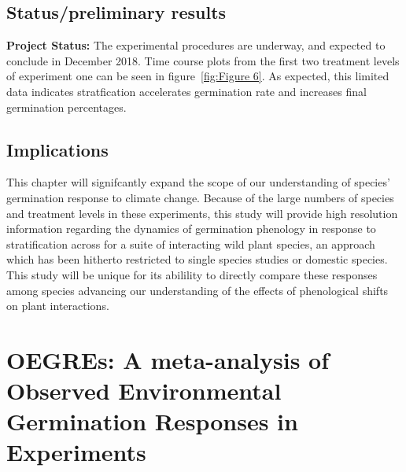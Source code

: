 \documentclass[12pt]{article}\usepackage[]{graphicx}\usepackage[]{color}
\begin{document}
\subsection*{Status/preliminary results}
\textbf{Project Status:} The experimental procedures are underway, and expected to conclude in December 2018. Time course plots from the first two treatment levels of experiment one can be seen in figure~\ref{fig:Figure 6}. As expected, this limited data indicates stratfication accelerates germination rate and increases final germination percentages.\\
\subsection*{Implications}
\indent\indent This chapter will signifcantly expand the scope of our understanding of species' germination response to climate change. Because of the large numbers of species and treatment levels in these experiments, this study will provide high resolution information regarding the dynamics of germination phenology in response to stratification across for a suite of interacting wild plant species, an approach which has been hitherto restricted to single species studies or domestic species. This study will be unique for its abilility to directly compare these responses among species advancing our understanding of the effects of phenological shifts on plant interactions.
\section*{OEGREs: A meta-analysis of Observed Environmental Germination Responses in Experiments}
\end{document}
